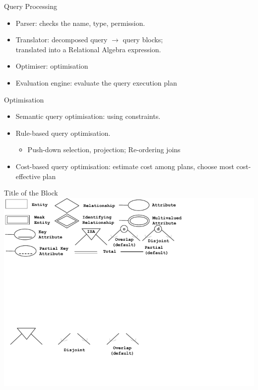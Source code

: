 \documentclass[a4paper]{article}
\begin{document}
\begin{cheatsheetblock} {Query Processing}
    \begin{itemize}
        \item Parser: checks the name, type, permission.
        \item Translator: decomposed query $\rightarrow$ query blocks; \\ translated into a Relational Algebra expression.
        \item Optimiser: optimisation
        \item Evaluation engine: evaluate the query execution plan
    \end{itemize}
\end{cheatsheetblock}

\begin{cheatsheetblock} {Optimisation}
    \begin{itemize}
        \item Semantic query optimisation: using constraints.
        \item Rule-based query optimisation.
              \begin{itemize}
                  \item Push-down selection, projection; Re-ordering joins
              \end{itemize}
        \item Cost-based query optimisation: estimate cost among plans, choose most cost-effective plan
    \end{itemize}
\end{cheatsheetblock}

\begin{cheatsheetblock}{Title of the Block}
    \includegraphics[width=\linewidth, page=1]{pic/EER.pdf}
\end{cheatsheetblock}




\end{document}
